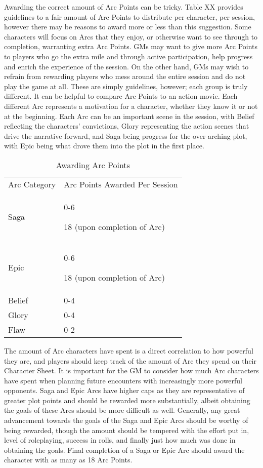 \documentclass[oneside,11pt,english]{book}
\begin{document}
Awarding the correct amount of Arc Points can be tricky. Table XX provides guidelines to a fair amount 
of Arc Points to distribute per character, per session, however there may be reasons to award more or less 
than this suggestion. Some characters will focus on Arcs that they enjoy, or otherwise want to see through 
to completion, warranting extra Arc Points. GMs may want to give more Arc Points to players who go the 
extra mile and through active participation, help progress and enrich the experience of the session. On the 
other hand, GMs may wish to refrain from rewarding players who mess around the entire session and do 
not play the game at all. These are simply guidelines, however; each group is truly different. 
It can be helpful to compare Arc Points to an action movie. Each different Arc represents a motivation for 
a character, whether they know it or not at the beginning. Each Arc can be an important scene in the 
session, with Belief reflecting the characters’ convictions, Glory representing the action scenes that drive 
the narrative forward, and Saga being progress for the over-arching plot, with Epic being what drove them 
into the plot in the first place. 

\begin{table}
	\centering
	\caption{Awarding Arc Points}
	\label{tab:AwardingArcPoints}
		\begin{tabu} spread 0pt {X[c,m]X[l,m] } %
Arc Category&Arc Points Awarded Per Session \\
	Saga&0-6

	18 (upon completion of Arc)\\
	Epic&0-6

	18 (upon completion of Arc)\\
Belief&0-4\\
Glory&0-4\\
Flaw&0-2\\
		\end{tabu} 
\end{table}
The amount of Arc characters have spent is a direct correlation to how powerful they are, and players 
should keep track of the amount of Arc they spend on their Character Sheet. It is important for the GM to 
consider how much Arc characters have spent when planning future encounters with increasingly more 
powerful opponents. 
Saga and Epic Arcs have higher caps as they are representative of greater plot points and should be 
rewarded more substantially, albeit obtaining the goals of these Arcs should be more difficult as well. 
Generally, any great advancement towards the goals of the Saga and Epic Arcs should be worthy of being 
rewarded, though the amount should be tempered with the effort put in, level of roleplaying, success in 
rolls, and finally just how much was done in obtaining the goals. Final completion of a Saga or Epic Arc 
should award the character with as many as 18 Arc Points. 
\end{document}
